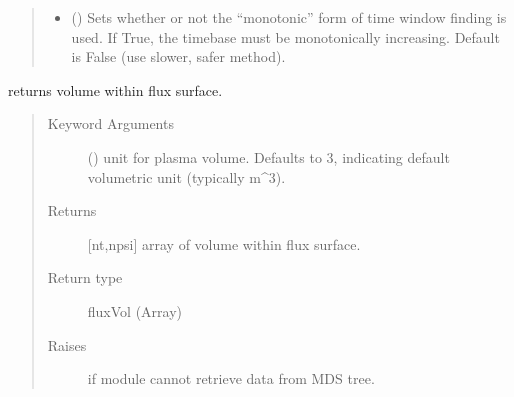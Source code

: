 \documentclass[letterpaper,10pt,english]{sphinxmanual}
\begin{document}
\begin{fulllineitems}
\begin{quote}
\begin{description}
\begin{itemize}
\item {} 
 () \textendash{} Sets whether or not the “monotonic” form of time
window finding is used. If True, the timebase must be monotonically
increasing. Default is False (use slower, safer method).

\end{itemize}

\end{description}\end{quote}

\begin{fulllineitems}
\label{\detokenize{eqtools:eqtools.CModEFIT.CModEFITTree.getFluxVol}}
returns volume within flux surface.
\begin{quote}\begin{description}
\item[{Keyword Arguments}] \leavevmode
{} () \textendash{} unit for plasma volume.  Defaults to 3,
indicating default volumetric unit (typically m\textasciicircum{}3).

\item[{Returns}] \leavevmode
{[}nt,npsi{]} array of volume within flux surface.

\item[{Return type}] \leavevmode
fluxVol (Array)

\item[{Raises}] \leavevmode
{} \textendash{} if module cannot retrieve data from MDS tree.

\end{description}\end{quote}

\end{fulllineitems}



\end{fulllineitems}
\end{document}
